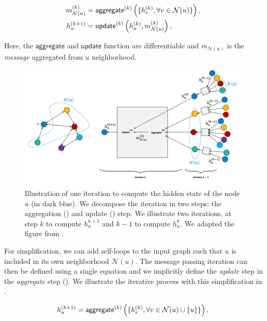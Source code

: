 \begin{align}
    m^{(k)}_{\mathcal{N}(u)} &= \mathsf{aggregate}^{(k)}\left(\{h_v^{(k)}, \forall v \in \mathcal{N}(u)\}\right), \labeq{aggregate} \\
    h^{(k+1)}_u &= \mathsf{update}^{(k)}\left(h^{(k)}_u, m^{(k)}_{\mathcal{N}(u)}\right), \labeq{update}
\end{align}

Here, the $\mathsf{aggregate}$ and $\mathsf{update}$ function are differentiable and $m_{\mathcal{N}(u)}$ is the \textit{message} aggregated from $u$ neighborhood. 

\begin{figure}[!htb]
\begin{center}
\includegraphics[width=16cm]{images/graph_update_5.png}
\end{center}
\caption{Illustration of one iteration to compute the hidden state of the node $u$ (in dark blue). We decompose the iteration in two steps: the aggregation () and update () step. We illustrate two iterations, at step $k$ to compute $h_u^{k+1}$ and $k-1$ to compute $h_u^{k}$. We adapted the figure from \textcite{hamilton_2020}.}
\end{figure}

For simplification, we can add self-loops to the input graph such that $u$ is included in its own neighborhood $\mathcal{N}(u)$. 
The message passing iteration can then be defined using a single equation and we implicitly define the \textit{update} step in the \textit{aggregate} step (). We illustrate the iterative process with this simplification in . 

\begin{equation}
    h^{(k+1)}_u = \mathsf{aggregate}^{(k)}\left(\{h_v^{(k)}, \forall v \in \mathcal{N}(u) \cup \{u\}\}\right), \labeq{update-aggregate}\\
\end{equation}

